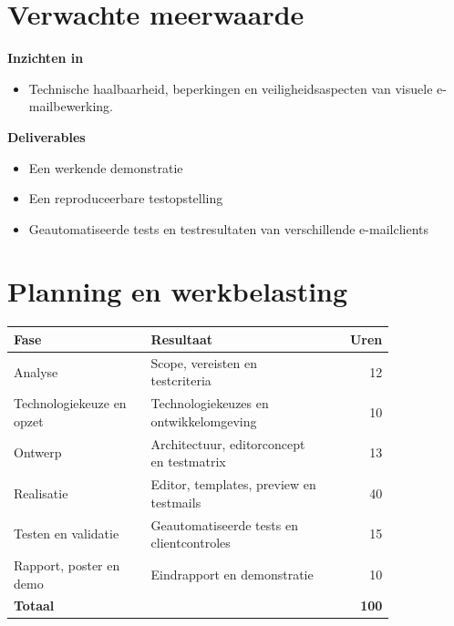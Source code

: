 \section{Verwachte meerwaarde}%
\label{vst:meerwaarde}

\textbf{Inzichten in}
\begin{itemize}
    \item Technische haalbaarheid, beperkingen en veiligheidsaspecten van visuele e-mailbewerking. 
\end{itemize}

\medskip  
\textbf{Deliverables}
\begin{itemize}
    \item Een werkende demonstratie
    \item Een reproduceerbare testopstelling 
    \item Geautomatiseerde tests en testresultaten van verschillende e-mailclients
\end{itemize}


\section{Planning en werkbelasting}%
\label{vst:planning}

\begin{center}
\small
\begin{tabular}{p{0.36\linewidth}p{0.47\linewidth}r}
\toprule
\textbf{Fase} & \textbf{Resultaat} & \textbf{Uren} \\
\midrule
Analyse & Scope, vereisten en testcriteria & 12 \\
Technologiekeuze en opzet & Technologiekeuzes en ontwikkelomgeving & 10 \\
Ontwerp & Architectuur, editorconcept en testmatrix & 13 \\
Realisatie & Editor, templates, preview en testmails & 40 \\
Testen en validatie & Geautomatiseerde tests en clientcontroles & 15 \\
Rapport, poster en demo & Eindrapport en demonstratie & 10 \\
\midrule
\textbf{Totaal} & & \textbf{100} \\
\bottomrule
\end{tabular}
\end{center}

